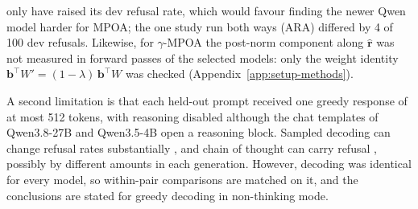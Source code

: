 only have raised its dev refusal rate, which would favour finding the newer
Qwen model harder for MPOA; the one study run both ways (ARA) differed by 4 of
100 dev refusals. Likewise, for $\gamma$-MPOA the post-norm component along
$\hat{\mathbf{r}}$ was not measured in forward passes of the selected models:
only the weight identity $\mathbf{b}^{\top}W'=(1-\lambda)\,\mathbf{b}^{\top}W$
was checked (Appendix~\ref{app:setup-methods}).

A second limitation is that each held-out prompt received one greedy
response of at most 512 tokens, with reasoning disabled although the chat
templates of Qwen3.8-27B and Qwen3.5-4B open a reasoning block. Sampled
decoding can change refusal rates substantially \cite{huang2024catastrophic},
and chain of thought can carry refusal \cite{yang2026beyond}, possibly by
different amounts in each generation. However, decoding was identical for
every model, so within-pair comparisons are matched on it, and the
conclusions are stated for greedy decoding in non-thinking mode.

